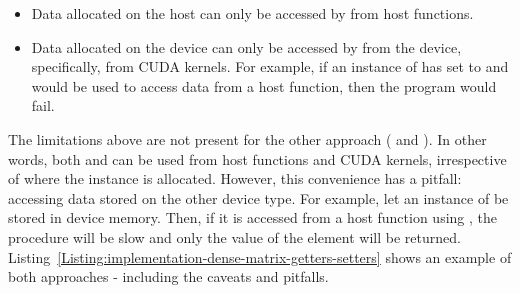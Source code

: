 \begin{itemize}
	\item Data allocated on the host can only be accessed by  from host functions.
	\item Data allocated on the device can only be accessed by  from the device, specifically, from CUDA kernels. For example, if an instance of  has  set to  and  would be used to access data from a host function, then the program would fail.
\end{itemize}

The limitations above are not present for the other approach ( and ). In other words, both  and  can be used from host functions and CUDA kernels, irrespective of where the  instance is allocated. However, this convenience has a pitfall: accessing data stored on the other device type. For example, let an instance of  be stored in device memory. Then, if it is accessed from a host function using , the procedure will be slow and only the value of the element will be returned. Listing~\ref{Listing:implementation-dense-matrix-getters-setters} shows an example of both approaches - including the caveats and pitfalls.


